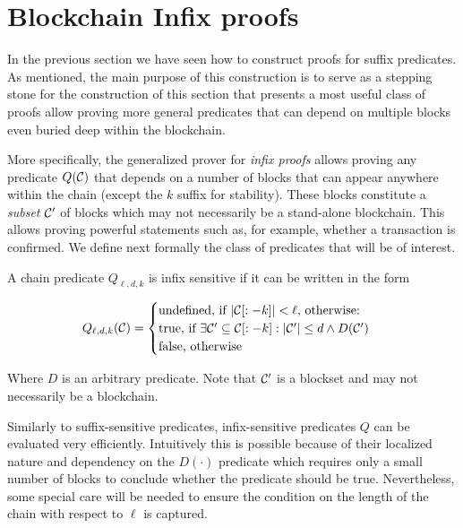 \section{Blockchain Infix proofs}

\label{sec:infix}


In the previous section we have seen how to construct proofs for suffix predicates.
As mentioned, the main purpose of this construction is to serve as a stepping
stone for the construction of this section that presents
a most useful class of
proofs allow proving more general predicates that can depend on multiple blocks
even buried deep within the blockchain.

More specifically, the generalized prover for
\textit{infix proofs} allows proving any predicate $Q(\mathcal{C})$ that depends on a
number of blocks that can appear anywhere within the chain (except the $k$
suffix for stability). These blocks constitute a \textit{subset} $\mathcal{C}'$ of
blocks which may not necessarily be a stand-alone blockchain. This allows
proving powerful statements such as, for example, whether a transaction is
confirmed.
We define next formally the class of predicates that will be of interest.

\begin{definition}
\label{def:infix}
A chain predicate $Q_{\ell,d,k}$ is \textnormal{infix sensitive} if it can be
written in the form

$$
Q_{\ell,d,k}(\mathcal{C}) =
\begin{cases}
  \text{undefined, if } |\mathcal{C}[:-k]| < \ell \text{, otherwise:}\\
  \text{true, if }
    \exists \mathcal{C}' \subseteq \mathcal{C}[:-k]: |\mathcal{C}'| \leq d \land D(\mathcal{C}')\\
  \text{false, otherwise}
\end{cases}
$$

Where $D$ is an arbitrary predicate. Note that $\mathcal{C}'$ is a blockset and may
not necessarily be a blockchain.
\end{definition}

Similarly to suffix-sensitive predicates, infix-sensitive predicates $Q$ can be evaluated very efficiently. Intuitively this is possible because
of their localized nature and dependency on the $D(\cdot)$ predicate which
requires only a small number of blocks to conclude whether the predicate should
be true. Nevertheless, some special care will be needed to ensure the condition
on the length  of the chain with respect to $\ell$ is captured.
